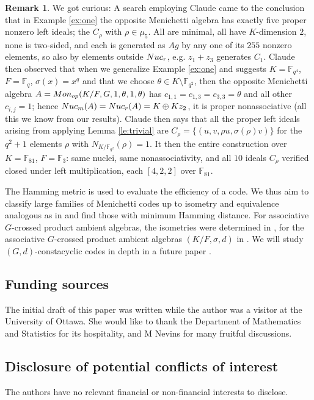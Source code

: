 \documentclass[11pt]{amsart}
\theoremstyle{plain}
\theoremstyle{definition}
\newtheorem{remark}[theorem]{Remark}
\begin{document}
\begin{remark}
We got curious: A search employing Claude came to the conclusion that in Example \ref{ex:one}
the opposite Menichetti algebra has exactly five
proper nonzero left ideals; the $C_\rho$ with $\rho\in\mu_5$. All are minimal, all
have $K$-dimension $2$, none is two-sided, and each is generated as $Ag$ by any one of
its $255$ nonzero elements, so also by elements outside ${\rm Nuc}_r$, e.g. $z_1+z_3$
generates $C_1$. Claude then observed that when we generalize Example \ref{ex:one} and suggests $K=\mathbb F_{q^{4}}$, $F=\mathbb F_q$, $\sigma(x)=x^{q}$ and that we choose
$\theta\in K\setminus\mathbb F_{q^{2}}$, then the opposite Menichetti algebra
$ A={\rm Mon}_{op}(K/F,G,1,\theta,1,\theta)$
has $c_{1,1}=c_{1,3}=c_{3,3}=\theta$ and all other $c_{i,j}=1$; hence
$\rm Nuc_m (A)=\rm Nuc_r (A)=K\oplus Kz_2$, it is proper nonassociative (all this we know from our results). Claude then says that all the
proper left ideals arising from applying  Lemma \ref{le:trivial} are
$C_\rho=\{(u,v,\rho u,\sigma(\rho)v)\}$ for the $q^{2}+1$ elements $\rho$ with
$N_{K/\mathbb F_{q^{2}}}(\rho)=1$. It then the entire construction  over
$K=\mathbb F_{81}$, $F=\mathbb F_3$: same
nuclei, same nonassociativity, and all $10$ ideals $C_\rho$ verified closed under left
multiplication, each $[4,2,2]$ over $\mathbb F_{81}$.
\end{remark}

 The Hamming metric is used to evaluate the efficiency of a code. We thus aim to
classify large families of Menichetti codes up to isometry and equivalence analogous as in \cite{Pum2025} and find those with minimum Hamming distance. For associative $G$-crossed product ambient algebras, the isometries were determined in \cite{GM}, for the associative $G$-crossed product ambient algebras $(K/F,\sigma,d)$ in \cite{NevPum2025, Pum2025}.
We will study
$(G,d)$-constacyclic codes in depth in a future paper \cite{Pum25.2}.



\subsection*{Funding sources} The initial draft of this paper was written  while the author was a visitor at the University of Ottawa. She would like to thank the Department of Mathematics and Statistics for its hospitality, and M Nevins for many fruitful discussions.




\subsection*{Disclosure of potential conflicts of interest} The authors have no relevant financial or non-financial interests to disclose.
\end{document}
